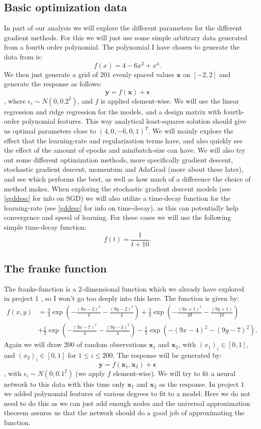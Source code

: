 \documentclass{article}
\begin{document}
\subsection{Basic optimization data}
\label{basicoptdesc}
In part of our analysis we will explore the different parameters for the
different gradient methods. For this we will just use some simple arbitrary data
generated from a fourth order polynomial. The polynomial I have chosen to
generate the data from is:
$$f(x) = 4 - 6 x^2 + x^4.$$
We then just generate a grid of $201$ evenly spaced values $\bm{x}$ on $[-2, 2]$
and generate the response as follows:
$$\bm{y} = f(\bm{x}) + \bm{\epsilon}$$
, where $\epsilon_i \sim N(0, 0.2^2)$, and $f$ is applied element-wise.  We will
use the linear regression and ridge regression for the models, and a
design matrix with fourth-order polynomial features. This way analytical
least-squares solution should give us optimal parameters close to $(4, 0, -6, 0,
      1)^T$. We will mainly explore the effect that the learning-rate and
regularization terms have, and also quickly see the effect of the amount
of epochs and minibatch-size can have. We will also try out some different
optimization methods, more specifically gradient descent, stochastic gradient
descent, momentum and AdaGrad (more about these later), and see which performs
the best, as well as how much of a difference the choice of method makes. When
exploring the stochastic gradient descent models (see \ref{sgddesc} for info on
SGD) we will also utilize a time-decay function for the learning-rate (see
\ref{gddesc} for info on time-decay), as this can potentially help convergence
and speed of learning. For these cases we will use the following simple
time-decay function:
$$f(t) = \frac{1}{t + 10}.$$

\subsection{The franke function}
The franke-function is a $2$-dimensional function which we already have explored
in project $1$ \cite{githubrepoproject1}, so I won't go too deeply into this
here. The function is given by:
\begin{align*}
      f(x,y) & = \frac{3}{4}\exp{\left(-\frac{(9x-2)^2}{4} - \frac{(9y-2)^2}{4}\right)}+\frac{3}{4}\exp{\left(-\frac{(9x+1)^2}{49}- \frac{(9y+1)}{10}\right)} \\
             & +\frac{1}{2}\exp{\left(-\frac{(9x-7)^2}{4} - \frac{(9y-3)^2}{4}\right)} -\frac{1}{5}\exp{\left(-(9x-4)^2 - (9y-7)^2\right) }.
\end{align*}
Again we will draw 200 of random observations $\bm{x}_1$ and $\bm{x}_2$, with
$(x_1)_i \in [0, 1]$, and $(x_2)_i \in [0, 1]$ for $1 \leq i \leq 200$. The response will be generated by:
$$\bm{y} = f(\bm{x}_1, \bm{x}_2) + \bm{\epsilon}$$
, with $\epsilon_i \sim N(0, 0.1^2)$ (we apply $f$ element-wise). We will try to
fit a neural network to this data with this time only $\bm{x}_1$ and $\bm{x}_2$
as the response. In project $1$ we added polynomial features of various degrees
to fit to a model. Here we do not need to do this as we can just add enough
nodes and the universal approximation theorem assures us that the network should
do a good job of approximating the function.
\end{document}
